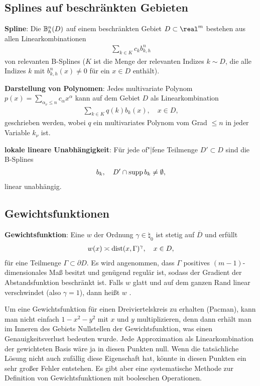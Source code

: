 \subsection{%
    Splines auf beschränkten Gebieten%
}

\textbf{Spline}:
Die  $\mathbb{B}_h^n(D)$ auf einem beschränkten Gebiet $D \subset \real^m$ bestehen aus
allen Linearkombinationen
\begin{align*}
    \sum_{k \in K} c_k b_{k,h}^n
\end{align*}
von relevanten B-Splines ($K$ ist die Menge der relevanten Indizes $k \sim D$, die alle
Indizes $k$ mit
$b_{k,h}^n(x) \not= 0$ für ein $x \in D$ enthält).

\textbf{Darstellung von Polynomen}:
Jedes multivariate Polynom $p(x) = \sum_{\alpha_\nu \le n} c_\alpha x^\alpha$ kann auf dem Gebiet
$D$ als Linearkombination
\begin{align*}
    \sum_{k \in K} q(k) b_k(x),\quad
    x \in D,
\end{align*}
geschrieben werden, wobei $q$ ein multivariates Polynom vom Grad $\le n$ in jeder Variable $k_\nu$
ist.

\textbf{lokale lineare Unabhängigkeit}:
Für jede of"|fene Teilmenge $D' \subset D$ sind die B-Splines
\begin{align*}
    b_k,\quad
    D' \cap \operatorname{supp} b_k \not= \emptyset,
\end{align*}
linear unabhängig.

\pagebreak

\subsection{%
    Gewichtsfunktionen%
}

\textbf{Gewichtsfunktion}:
Eine  $w$
der Ordnung $\gamma \in \natural_0$ ist stetig auf $\overline{D}$ und erfüllt
\begin{align*}
    w(x) \asymp \operatorname{dist}(x, \Gamma)^\gamma,\quad
    x \in D,
\end{align*}
für eine Teilmenge $\Gamma \subset \partial D$.
Es wird angenommen, dass $\Gamma$ positives $(m - 1)$-dimensionales Maß besitzt und genügend
regulär ist, sodass der Gradient der Abstandsfunktion beschränkt ist.
Falls $w$ glatt und auf dem ganzen Rand linear verschwindet (also $\gamma = 1$),
dann heißt $w$ .

Um eine Gewichtsfunktion für einen Dreiviertelskreis zu erhalten (Pacman), kann man nicht einfach
$1 - x^2 - y^2$ mit $x$ und $y$ multiplizieren, denn dann erhält man im Inneren des Gebiets
Nullstellen der Gewichtsfunktion, was einen Genauigkeitsverlust bedeuten wurde.
Jede Approximation als Linearkombination der gewichteten Basis wäre ja in diesen Punkten null.
Wenn die tatsächliche Lösung nicht auch zufällig diese Eigenschaft hat, könnte in diesen Punkten
ein sehr großer Fehler entstehen.
Es gibt aber eine systematische Methode zur Definition von Gewichtsfunktionen mit booleschen
Operationen.

